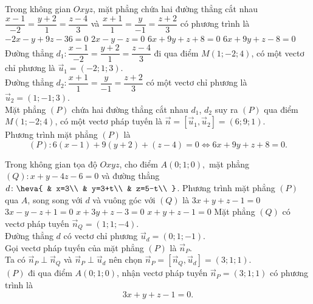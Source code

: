 \begin{ex}%
	Trong không gian $ Oxyz$, mặt phẳng chứa hai đường thẳng cắt nhau $\dfrac{x-1}{-2}=\dfrac{y+2}{1}=\dfrac{z-4}{3}$ và $\dfrac{x+1}{1}=\dfrac{y}{-1}=\dfrac{z+2}{3}$ có phương trình là
	\choice
	{$-2x-y+9z-36=0$}
	{$ 2x-y-z=0$}
	{\True $ 6x+9y+z+8=0$}
	{$ 6x+9y+z-8=0$}
	\loigiai
	{
		Đường thẳng $d_1\colon\dfrac{x-1}{-2}=\dfrac{y+2}{1}=\dfrac{z-4}{3}$ đi qua điểm $ M(1;-2;4)$, có một vectơ chỉ phương là $\overrightarrow{u}_1=(-2;1;3)$.\\
		Đường thẳng $d_2\colon\dfrac{x+1}{1}=\dfrac{y}{-1}=\dfrac{z+2}{3}$ có một vectơ chỉ phương là $\overrightarrow{u}_2=(1;-1;3)$.\\
		Mặt phẳng $(P)$ chứa hai đường thẳng cắt nhau $d_1$, $d_2$ suy ra $(P)$ qua điểm $ M(1;-2;4)$, có một vectơ pháp tuyến là $\overrightarrow{n}=\left[\overrightarrow{u}_1,\overrightarrow{u}_2\right]=(6;9;1)$.\\ Phương trình mặt phẳng $(P)$ là 
		$$(P)\colon 6(x-1)+9(y+2)+(z-4)=0\Leftrightarrow 6x+9y+z+8=0.$$}
\end{ex}

\begin{ex}%
	Trong không gian tọa độ $ Oxyz$, cho điểm $ A(0;1;0),$ mặt phẳng  $(Q)\colon x+y-4z-6=0$ và đường thẳng $ d\colon\heva{
		& x=3\\ 
		& y=3+t\\ 
		& z=5-t\\ 
	}$. Phương trình mặt phẳng $(P)$ qua $ A$, song song với $ d$ và vuông góc với $(Q)$ là 
	\choice
	{\True $ 3x+y+z-1=0$}
	{$ 3x-y-z+1=0$}
	{$ x+3y+z-3=0$}
	{$ x+y+z-1=0$}
	\loigiai
	{
		Mặt phẳng $(Q)$ có vectơ pháp tuyến $\overrightarrow{n}_Q=(1;1;-4)$.\\
		Đường thẳng $ d$ có vectơ chỉ phương $\overrightarrow{u}_d=(0;1;-1)$.\\
		Gọi vectơ pháp tuyến của mặt phẳng $(P)$ là $\overrightarrow{n}_P$.\\
		Ta có $\overrightarrow{n}_P\perp\overrightarrow{n}_Q$ và $\overrightarrow{n}_P\perp\overrightarrow{u}_d$ nên chọn $\overrightarrow{n}_P=\left[\overrightarrow{n}_Q,\overrightarrow{u}_d\right]=(3;1;1)$.\\
		$(P)$ đi qua điểm $ A(0;1;0)$, nhận vectơ pháp tuyến $\overrightarrow{n}_P=(3;1;1)$ có phương trình là $$ 3x+y+z-1=0.$$}
\end{ex}


